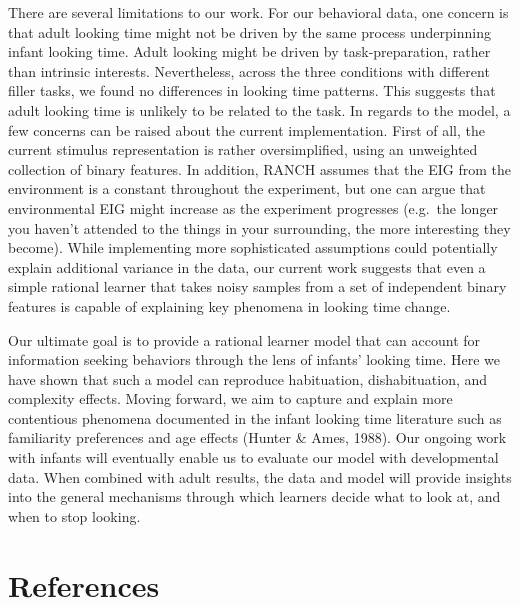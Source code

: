\documentclass[10pt, letterpaper]{article}
\begin{document}
There are several limitations to our work. For our behavioral data, one
concern is that adult looking time might not be driven by the same
process underpinning infant looking time. Adult looking might be driven
by task-preparation, rather than intrinsic interests. Nevertheless,
across the three conditions with different filler tasks, we found no
differences in looking time patterns. This suggests that adult looking
time is unlikely to be related to the task. In regards to the model, a
few concerns can be raised about the current implementation. First of
all, the current stimulus representation is rather oversimplified, using
an unweighted collection of binary features. In addition, RANCH assumes
that the EIG from the environment is a constant throughout the
experiment, but one can argue that environmental EIG might increase as
the experiment progresses (e.g.~the longer you haven't attended to the
things in your surrounding, the more interesting they become). While
implementing more sophisticated assumptions could potentially explain
additional variance in the data, our current work suggests that even a
simple rational learner that takes noisy samples from a set of
independent binary features is capable of explaining key phenomena in
looking time change.

Our ultimate goal is to provide a rational learner model that can
account for information seeking behaviors through the lens of infants'
looking time. Here we have shown that such a model can reproduce
habituation, dishabituation, and complexity effects. Moving forward, we
aim to capture and explain more contentious phenomena documented in the
infant looking time literature such as familiarity preferences and age
effects (Hunter \& Ames, 1988). Our ongoing work with infants will
eventually enable us to evaluate our model with developmental data. When
combined with adult results, the data and model will provide insights
into the general mechanisms through which learners decide what to look
at, and when to stop looking.

\hypertarget{references}{%
\section{References}\label{references}}

\setlength{\parindent}{-0.1in} 
\setlength{\leftskip}{0.125in}

\noindent
\end{document}
